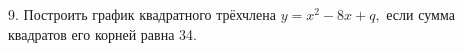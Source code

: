 9. Построить график квадратного трёхчлена $y=x^2-8x+q,$ если сумма квадратов его корней равна 34.\\
